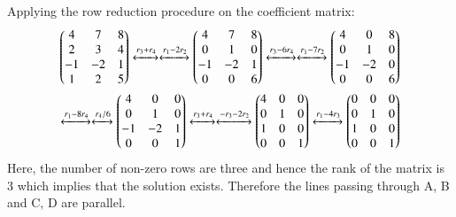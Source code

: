 \documentclass[journal,12pt,twocolumn]{IEEEtran}
\begin{document}
Applying the row reduction procedure on the coefficient matrix:
\begin{align*}
	\begin{pmatrix}4 & 7 & 8\\ 2 & 3 & 4\\ -1 & -2 & 1\\ 1 & 2 & 5\end{pmatrix}
	\xleftrightarrow{r_3+r_4}\xleftrightarrow{r_1 - 2r_2}
	\begin{pmatrix}4 & 7 & 8\\ 0 & 1 & 0\\ -1 & -2 & 1\\ 0 & 0 & 6\end{pmatrix}
	\xleftrightarrow{r_3-6r_4}\xleftrightarrow{r_1 - 7r_2}
	\begin{pmatrix}4 & 0 & 8\\ 0 & 1 & 0\\ -1 & -2 & 0\\ 0 & 0 & 6\end{pmatrix}\\
	\xleftrightarrow{r_1-8r_4}\xleftrightarrow{r_4/6}
	\begin{pmatrix}4 & 0 & 0\\ 0 & 1 & 0\\ -1 & -2 & 1\\ 0 & 0 & 1 \end{pmatrix} 
    \xleftrightarrow{r_3+r_4}\xleftrightarrow{-r_3 - 2r_2}
	\begin{pmatrix}4 & 0 & 0\\ 0 & 1 & 0\\ 1 & 0 & 0\\ 0 & 0 & 1\end{pmatrix}
	\xleftrightarrow{r_1 - 4r_3}
	\begin{pmatrix}0 & 0 & 0\\ 0 & 1 & 0\\ 1 & 0 & 0\\ 0 & 0 & 1\end{pmatrix}
\end{align*}
Here, the number of non-zero rows are three and hence the rank of the matrix is 3 which implies that the solution exists. Therefore the lines passing through A, B and C, D are parallel.
\end{document}
